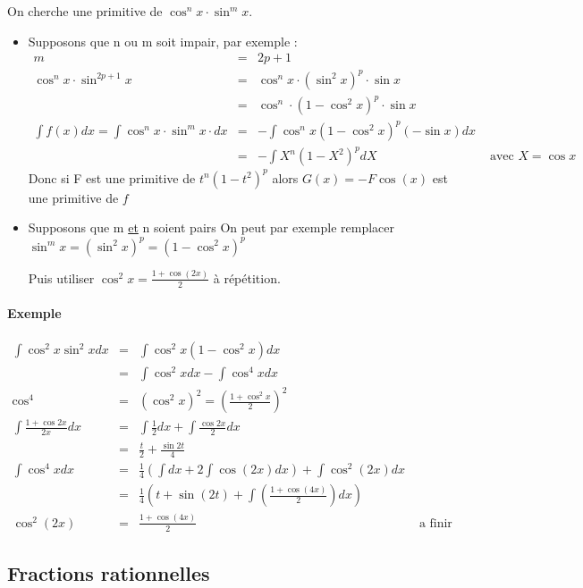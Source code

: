 On cherche une primitive de $\cos^nx \cdot \sin^m x$.

\begin{itemize}
	\item Supposons que n ou m soit impair, par exemple : \[\begin{array}{rclr}
			m&=& 2p + 1 \\
\cos^n x \cdot \sin^{2p+1}x &=& \cos^n x \cdot (\sin^2 x)^p \cdot \sin x \\
&=& \cos^n \cdot (1-\cos^2 x)^p \cdot \sin x \\
\int f(x)dx = \int \cos^n x \cdot \sin^m x \cdot dx &=& -\int \cos^n x (1-\cos^2 x)^p (-\sin x) dx \\
&=& - \int X^n (1-X^2)^p dX & \text{ avec } X = \cos x
\end{array}\]
	Donc si F est une primitive de $t^n  (1-t^2)^p$ alors $G(x) = -F \cos(x)$ est une primitive de $f$

	\item Supposons que m \ul{et} n soient pairs
	On peut par exemple remplacer $\sin^m x = (\sin^{2}x)^p = (1-\cos^2 x)^p$

	Puis utiliser $\cos^2 x = \frac{1+\cos(2x)}{2}$ à répétition.

\end{itemize}

\paragraph{Exemple}
	\[\begin{array}{rclr}
		\int \cos^2 x \sin^2 x dx &=& \int \cos^2 x (1-\cos^2 x)dx \\
&=& \int \cos^2 x dx - \int \cos^4 x dx \\
\cos ^4 &=& (\cos^2 x)^2 = (\frac{1+\cos^2 x}{2})^2 \\
\int \frac{1 + \cos 2 x}{2x} dx &=& \int \frac{1}{2} dx + \int \frac{\cos 2x}{2}dx \\
&=& \frac{t}{2} + \frac{\sin 2t}{4} \\
\int \cos^4 x dx &=& \frac{1}{4}(\int dx + 2\int \cos(2x) dx) + \int \cos^2(2x)dx \\
&=& \frac{1}{4}(t + \sin(2t) + \int (\frac{1+\cos(4x)}{2}) dx) \\
\cos^2(2x) &=& \frac{1+\cos(4x)}{2} & \text{ a finir } \end{array}\]

\subsection{Fractions rationnelles}

